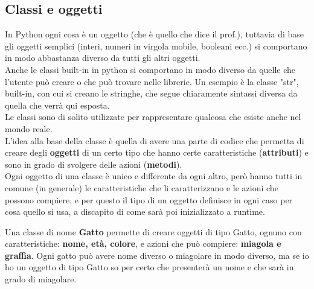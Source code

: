 \documentclass[10pt]{article}
\newcommand{\<}{\langle}
\renewcommand{\>}{\rangle}
\theoremstyle{mystyle}{\newtheorem*{remark}{Nota}}
\theoremstyle{mystyle}{\newtheorem*{remarks}{Note}}
\theoremstyle{mystyle}{\newtheorem*{example}{Esempio}}
\theoremstyle{mystyle}{\newtheorem*{examples}{Esempi}}
\theoremstyle{definition}{\newtheorem*{exercise}{Exercise}}
\theoremstyle{warn}
\begin{document}
\subsection{Classi e oggetti}
In Python ogni cosa è un oggetto (che è quello che dice il prof.), tuttavia di base gli oggetti semplici (interi, numeri in virgola mobile, booleani ecc.) si comportano in modo abbastanza diverso da tutti gli altri oggetti.\\
Anche le classi built-in in python si comportano in modo diverso da quelle che l'utente può creare o che può trovare nelle librerie. Un esempio è la classe "str", built-in, con cui si creano le stringhe, che segue chiaramente sintassi diversa da quella che verrà qui esposta.\\
Le classi sono di solito utilizzate per rappresentare qualcosa che esiste anche nel mondo reale.\\
L'idea alla base della classe è quella di avere una parte di codice che permetta di creare degli \textbf{oggetti} di un certo tipo che hanno certe caratteristiche (\textbf{attributi}) e sono in grado di svolgere delle azioni (\textbf{metodi}).\\
Ogni oggetto di una classe è unico e differente da ogni altro, però hanno tutti in comune (in generale) le caratteristiche che li caratterizzano e le azioni che possono compiere, e per questo il tipo di un oggetto definisce in ogni caso per cosa quello si usa, a discapito di come sarà poi inizializzato a runtime.
\begin{example}
Una classe di nome \textbf{Gatto} permette di creare oggetti di tipo Gatto, ognuno con caratteristiche: \textbf{nome, età, colore}, e azioni che può compiere: \textbf{miagola e graffia}. Ogni gatto può avere nome diverso o miagolare in modo diverso, ma se io ho un oggetto di tipo Gatto so per certo che presenterà un nome e che sarà in grado di miagolare.
\end{example}
\end{document}
